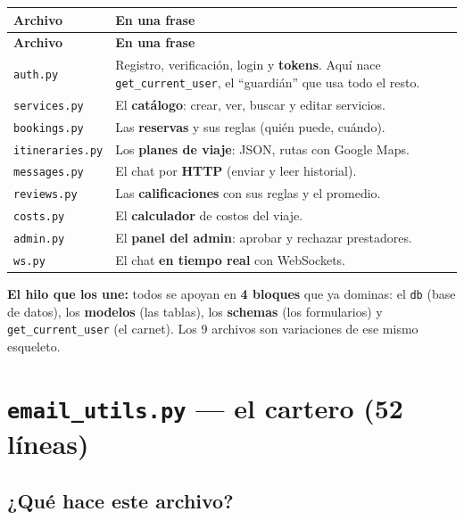 \documentclass[11pt,a4paper]{article}
\begin{document}
\begin{center}
{\small
\setlength{\tabcolsep}{4pt}
\begin{longtable}{@{}>{\raggedright\arraybackslash}p{3.4cm}>{\raggedright\arraybackslash}p{11.4cm}@{}}
\toprule
\textbf{Archivo} & \textbf{En una frase} \\
\midrule
\endfirsthead
\toprule
\textbf{Archivo} & \textbf{En una frase} \\
\midrule
\endhead
\texttt{auth.py} & Registro, verificación, login y \textbf{tokens}. Aquí nace
\texttt{get\_current\_user}, el ``guardián'' que usa todo el resto. \\
\texttt{services.py} & El \textbf{catálogo}: crear, ver, buscar y editar servicios. \\
\texttt{bookings.py} & Las \textbf{reservas} y sus reglas (quién puede, cuándo). \\
\texttt{itineraries.py} & Los \textbf{planes de viaje}: JSON, rutas con Google Maps. \\
\texttt{messages.py} & El chat por \textbf{HTTP} (enviar y leer historial). \\
\texttt{reviews.py} & Las \textbf{calificaciones} con sus reglas y el promedio. \\
\texttt{costs.py} & El \textbf{calculador} de costos del viaje. \\
\texttt{admin.py} & El \textbf{panel del admin}: aprobar y rechazar prestadores. \\
\texttt{ws.py} & El chat \textbf{en tiempo real} con WebSockets. \\
\bottomrule
\end{longtable}
}
\end{center}

\textbf{El hilo que los une:} todos se apoyan en \textbf{4 bloques} que ya dominas: el
\texttt{db} (base de datos), los \textbf{modelos} (las tablas), los \textbf{schemas} (los
formularios) y \texttt{get\_current\_user} (el carnet). Los 9 archivos son variaciones de ese
mismo esqueleto.

\section{\texttt{email\_utils.py} --- el cartero (52 líneas)}

\subsection{¿Qué hace este archivo?}
\end{document}
